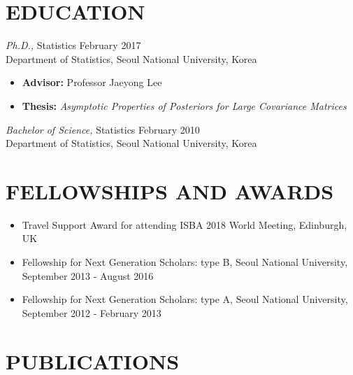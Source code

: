 \documentclass[margin, 10pt]{res} %
\begin{document}
\begin{resume}
\section{\sf EDUCATION}

{\sl Ph.D.,} Statistics  \hfill February 2017 \\
Department of Statistics, Seoul National University, Korea
\begin{itemize} \itemsep -1.0pt %
\item {\bf Advisor:} Professor Jaeyong Lee
\item {\bf Thesis:} \emph{Asymptotic Properties of Posteriors for Large Covariance Matrices}
\end{itemize}

{\sl Bachelor of Science,} Statistics  \hfill February 2010 \\
Department of Statistics, Seoul National University, Korea
\vspace{.2cm}


\section{\sf FELLOWSHIPS AND AWARDS} 

\begin{itemize}
	\item Travel Support Award for attending ISBA 2018 World Meeting, Edinburgh, UK
	\item Fellowship for Next Generation Scholars: type B, Seoul National University, September 2013 - August 2016
	\item Fellowship for Next Generation Scholars: type A, Seoul National University, September 2012 - February 2013
\end{itemize}
\vspace{.2cm}




\section{\sf PUBLICATIONS} 


\end{resume}
\end{document}
